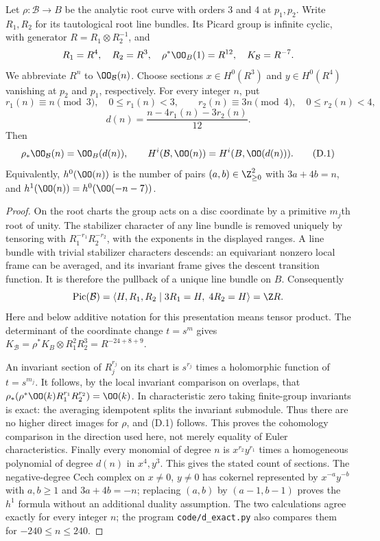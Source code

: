 \begin{proposition}\label{inv:D1.1}
Let $\rho:\mathcal B\to B$ be the analytic root curve with orders $3$ and
$4$ at $p_1,p_2$. Write $R_1,R_2$ for its tautological root line bundles.
Its Picard group is infinite cyclic, with generator
$R=R_1\otimes R_2^{-1}$, and
\[
 R_1=R^4,\quad R_2=R^3,\quad \rho^*\OO_B(1)=R^{12},
 \quad K_{\mathcal B}=R^{-7}.
\]
We abbreviate $R^n$ to $\OO_{\mathcal B}(n)$. Choose sections
$x\in H^0(R^3)$ and $y\in H^0(R^4)$ vanishing at $p_2$ and $p_1$,
respectively. For every integer $n$, put
\[
 r_1(n)\equiv n\pmod3,\quad 0\le r_1(n)<3,
 \qquad r_2(n)\equiv3n\pmod4,\quad0\le r_2(n)<4,
\]
\[
 d(n)=\frac{n-4r_1(n)-3r_2(n)}{12}.
\]
Then
\[
 \rho_*\OO_{\mathcal B}(n)=\OO_B(d(n)),\qquad
 H^i(\mathcal B,\OO(n))=H^i(B,\OO(d(n))).                 \tag{D.1}
\]
Equivalently, $h^0(\OO(n))$ is the number of pairs
$(a,b)\in\Z_{\ge0}^2$ with $3a+4b=n$, and
$h^1(\OO(n))=h^0(\OO(-n-7))$.
\end{proposition}
\begin{proof}
On the root charts the group acts on a disc coordinate by a primitive
$m_j$th root of unity. The stabilizer character of any line bundle is
removed uniquely by tensoring with $R_1^{-r_1}R_2^{-r_2}$, with the
exponents in the displayed ranges. A line bundle with trivial stabilizer
characters descends: an equivariant nonzero local frame can be averaged,
and its invariant frame gives the descent transition function. It is
therefore the pullback of a unique line bundle on $B$. Consequently
\[
 \operatorname{Pic}(\mathcal B)=
 \langle H,R_1,R_2\mid 3R_1=H,\;4R_2=H\rangle=\Z R.
\]
Here and below additive notation for this presentation means tensor
product. The determinant of the coordinate change $t=s^m$ gives
$K_{\mathcal B}=\rho^*K_B\otimes R_1^2R_2^3=R^{-24+8+9}$.

An invariant section of $R_j^{r_j}$ on its chart is $s^{r_j}$ times a
holomorphic function of $t=s^{m_j}$. It follows, by the local invariant
comparison on overlaps, that
$\rho_*(\rho^*\OO(k)R_1^{r_1}R_2^{r_2})=\OO(k)$.
In characteristic zero taking finite-group invariants is exact: the
averaging idempotent splits the invariant submodule. Thus there are no
higher direct images for $\rho$, and (D.1) follows. This proves the
cohomology comparison in the direction used here, not merely equality
of Euler characteristics. Finally every monomial of degree $n$ is
$x^{r_2}y^{r_1}$ times a homogeneous polynomial of degree $d(n)$ in
$x^4,y^3$. This gives the stated count of sections. The negative-degree
Cech complex on $x\ne0$, $y\ne0$ has cokernel represented by
$x^{-a}y^{-b}$ with $a,b\ge1$ and $3a+4b=-n$; replacing $(a,b)$ by
$(a-1,b-1)$ proves the $h^1$ formula without an additional duality
assumption. The two calculations agree exactly for every integer $n$;
the program \texttt{code/d\_exact.py} also compares them for
$-240\le n\le240$.
\end{proof}

